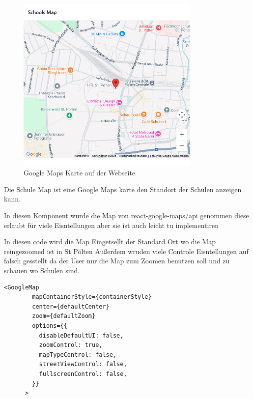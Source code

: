 \begin{inhalt}
\begin{enumerate}[label=\textbf{\arabic*.}]
\begin{figure}[!htb]
\centering
\includegraphics[width=0.8\textwidth]{files/Thomas/pics/Website/admin/school/school-map.png}
\caption[Bildbezeichnung für Abbildungsverzeichnis]{Google Maps Karte auf der Webseite}
\label{fig:gehaeuse_internet_bild}
\end{figure}

Die Schule Map ist eine Google Maps karte den Standort
der Schulen anzeigen kann.

\vspace{1cm}


In diesen Komponent wurde die Map von react-google-maps/api genommen diese erlaubt für viele Eisntellungen aber sie ist auch leicht tu implementiren

\vspace{0.15cm}

In diesen code wird die Map Eingetsellt der Standard Ort wo die Map reingezoomed ist in St Pölten
Außerdem wruden viele Controle Eisntellungen auf falsch gesstellt da der User nur die Map zum Zoomen benutzen soll und zu schauen wo Schulen sind.


\begin{lstlisting}[language=mytsx]
<GoogleMap
        mapContainerStyle={containerStyle}
        center={defaultCenter}
        zoom={defaultZoom}
        options={{
          disableDefaultUI: false,
          zoomControl: true,
          mapTypeControl: false,
          streetViewControl: false,
          fullscreenControl: false,
        }}
      >
\end{lstlisting}






\end{enumerate}
\end{inhalt}

